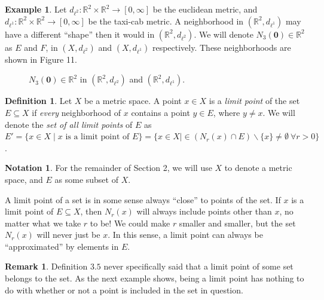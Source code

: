 \documentclass{article}
\newcommand{\R}{\mathbb{R}}
\theoremstyle{definition}
\newtheorem{definition}{Definition}[section]
\newtheorem{note}{Notation}[section]
\newtheorem{example}{Example}[section]
\newtheorem{remark}{Remark}[section]
\begin{document}
\begin{example}
Let $ d_{\ell^2}:\R^2\times\R^2\to[0,\infty] $ be the euclidean metric, and $ d_{\ell^1}:\R^2\times\R^2\to[0,\infty] $ be the taxi-cab metric. A neighborhood in $ (\R^2, d_{\ell^1}) $ may have a different ``shape'' then it would in $ (\R^2, d_{\ell^2}) $. We will denote $ N_{3}(\mathbf{0})\in \R^2 $ as $ E $ and $ F $, in $ (X,d_{\ell^2}) $ and $ (X,d_{\ell^1}) $ respectively. These neighborhoods are shown in Figure 11.     
	\begin{figure}[h!]
	\centering
	\caption{$ N_{3}(\mathbf{0})\in \R^2 $ in $ (\R^2, d_{\ell^2}) $ and $ (\R^2, d_{\ell^1}) $. }
\end{figure}	
\end{example}
\begin{definition}
	Let $ X $ be a metric space. A point $ x\in X $ is a \textit{\color{red}limit point} of the set $ E\subseteq X $ if \textit{every} neighborhood of $ x $ contains a point $ y\in E $, where $ y\neq x $. We will denote the \textit{\color{red} set of all limit points} of $ E $ as $ E'=\{x\in X\mid x\text{ is a limit point of }E \}=\{x\in X\mid \in (N_r(x)\cap E)\backslash\{x\}\neq\emptyset\ \forall r>0\} $.
\end{definition}
\begin{note}
	For the remainder of Section 2, we will use $ X $ to denote a metric space, and $ E $ as some subset of $ X $. 
\end{note}
A limit point of a set is in some sense always ``close'' to points of the set. If $ x $ is a limit point of $ E\subseteq X $, then $ N_r(x) $ will always include points other than $ x $, no matter what we take $ r $ to be! We could make $ r $ smaller and smaller, but the set $ N_r(x) $ will never just be $ x $. In this sense, a limit point can always be ``approximated'' by elements in $ E $.  
\begin{remark}
Definition $ 3.5 $ never specifically said that a limit point of some set belongs to the set. As the next example shows, being a limit point has nothing to do with whether or not a point is included in the set in question. 	
\end{remark}
\end{document}
